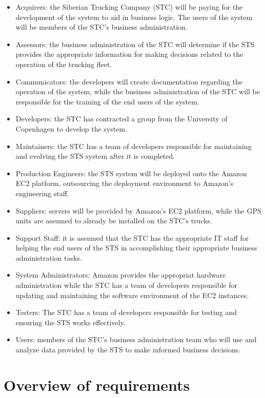 \documentclass[a4paper,11pt]{report}
\begin{document}
\begin{itemize}
  \item Acquirers: the Siberian Trucking Company (STC) will be paying for the
    development of the system to aid in business logic. The users of the system
    will be members of the STC's business administration.
  \item Assessors: the business administration of the STC will determine if the
    STS provides the appropriate information for making decisions related to
    the operation of the trucking fleet.
  \item Communicators: the developers will create documentation regarding the
    operation of the system, while the business administration of the STC will
    be responsible for the training of the end users of the system.
  \item Developers: the STC has contracted a group from the University of
    Copenhagen to develop the system.
  \item Maintainers: the STC has a team of developers responsible for
    maintaining and evolving the STS system after it is completed.
  \item Production Engineers: the STS system will be deployed onto the Amazon
    EC2 platform, outsourcing the deployment environment to Amazon's
    engineering staff.
  \item Suppliers: servers will be provided by Amazon's EC2 platform, while the
    GPS units are assumed to already be installed on the STC's trucks.
  \item Support Staff: it is assumed that the STC has the appropriate IT staff
    for helping the end users of the STS in accomplishing their appropriate
    business administration tasks.
  \item System Administrators: Amazon provides the appropriat hardware
    administration while the STC has a team of developers responsible for
    updating and maintaining the software environment of the EC2 instances.
  \item Testers: The STC has a team of developers responsible for testing and
    ensuring the STS works effectively.
  \item Users: members of the STC's business administration team who will use
    and analyze data provided by the STS to make informed business decisions.
\end{itemize}

\section{Overview of requirements}
\label{sec:overv-requ}
\end{document}
